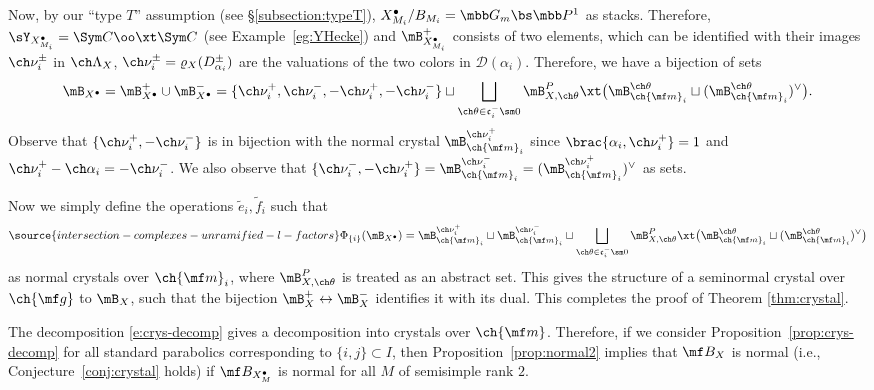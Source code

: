 Now, by our ``type $T$'' assumption (see \S \ref{subsection:typeT}), $X_{M_i}^\bullet / B_{M_i} = \mbb G_m \bs \mbb P^1$ as stacks.
Therefore, $\sY_{X_{M_i}^\bullet} = \Sym C \oo\xt \Sym C$ (see Example~\ref{eg:YHecke})
and $\mB_{X_{M_i}^\bullet}^+$ consists of two elements, which can be identified with their images $\ch\nu_i^{\pm}$ in $\ch\Lambda_X$,
$\ch\nu_i^\pm = \varrho_X( D_{\alpha_i}^\pm )$ are the valuations of the two colors in $\mathcal D(\alpha_i)$.
Therefore, we have a bijection of sets
\[ \mB_{X^\bullet} = \mB^+_{X^\bullet} \cup \mB^-_{X^\bullet} = \{ \ch\nu_i^+, \ch\nu_i^-, -\ch\nu_i^+, -\ch\nu_i^- \} \sqcup \bigsqcup_{\ch\theta \in \mathfrak c_i^-\sm 0}
\mB^P_{X,\ch\theta} \xt \bigl(
\mB^{\ch\theta}_{\ch{\mf m}_i} \sqcup (\mB^{\ch\theta}_{\ch{\mf m}_i})^\vee \bigr).
\]
Observe that $\{\ch\nu_i^+, -\ch\nu_i^-\}$ is in bijection with
the normal crystal $\mB_{\ch{\mf m}_i}^{\ch\nu_i^+}$ since $\brac{\alpha_i,\ch\nu_i^+}=1$
and $\ch\nu_i^+ - \ch\alpha_i = -\ch\nu_i^-$.
We also observe that $\{ \ch\nu_i^-, -\ch\nu_i^+\} = \mB_{\ch{\mf m}_i}^{\ch\nu_i^-} =
(\mB_{\ch{\mf m}_i}^{\ch\nu_i^+})^\vee$ as sets.

Now we simply define the operations $\tilde e_i, \tilde f_i$ such that
\begin{equation}\label{e:iselfdual}
\source{intersection-complexes-unramified-l-factors}
    \Phi_{\{i\}}(\mB_{X^\bullet}) = \mB_{\ch{\mf m}_i}^{\ch\nu_i^+} \sqcup
    \mB_{\ch{\mf m}_i}^{\ch\nu_i^-} \sqcup
    \bigsqcup_{\ch\theta \in \mathfrak c_i^-\sm 0} \mB^P_{X,\ch\theta}
    \xt \bigl(
    \mB^{\ch\theta}_{\ch{\mf m}_i} \sqcup (\mB^{\ch\theta}_{\ch{\mf m}_i})^\vee \bigr)
\end{equation}
as normal crystals over $\ch{\mf m}_i$, where $\mB^P_{X,\ch\theta}$ is treated as
an abstract set.
This gives the structure of a seminormal
crystal over $\ch{\mf g}$ to $\mB_X$, such that the bijection $\mB_X^+\leftrightarrow\mB_X^-$ identifies it with its dual. This completes the proof of Theorem \ref{thm:crystal}.

\begin{rem}
\notready \label{rem:conj2}
The decomposition \eqref{e:crys-decomp} gives a decomposition into crystals
over $\ch{\mf m}$. Therefore, if we consider Proposition~\ref{prop:crys-decomp}
for all standard parabolics corresponding to $\{i,j\} \subset I$, then
Proposition~\ref{prop:normal2} implies that $\mf B_X$ is normal (i.e., Conjecture~\ref{conj:crystal} holds)
if $\mf B_{X_M^\bullet}$ is normal for all $M$ of semisimple rank $2$.
\end{rem}


